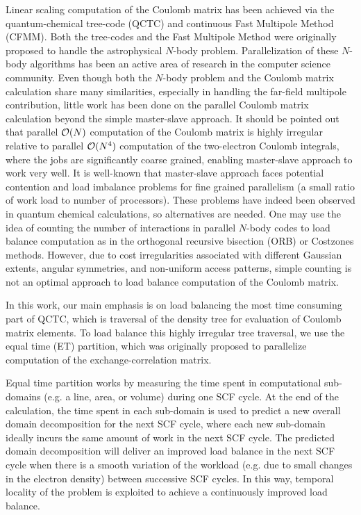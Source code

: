 \commentoutA{\documentclass[prl,aps,twocolumn,twocolumngrid,superbib]{revtex4}}
\begin{document}
Linear scaling computation of the Coulomb matrix has been achieved via
the quantum-chemical tree-code
(QCTC)\cite{MChallacombe96,MChallacombe96B,MChallacombe97} and
continuous Fast Multipole Method
(CFMM)\cite{CWhite94B,CWhite96A,MStrain96}.  Both the
tree-codes\cite{JBarnes86} and the Fast Multipole
Method\cite{LGreengard87,CRAnderson92} were originally proposed to
handle the astrophysical $N$-body problem.  Parallelization of these
$N$-body algorithms has been an active area of research in the
computer science
community\cite{MWarren92,AGrama94,MWarren95b,Singh93,Singh_95v27,YHu96,Grama_98v24,PGibbon02,Antonuccio-Delogu03}.
Even though both the $N$-body problem and the Coulomb matrix
calculation share many similarities, especially in handling the
far-field multipole contribution, little work has been done on the
parallel Coulomb matrix calculation beyond the simple master-slave
approach\cite{Sosa_98v19,Furlani_00v128,Sosa_00v26}.  It should be
pointed out that parallel ${\cal O}(N)$ computation of the Coulomb
matrix is highly irregular relative to parallel ${\cal O}(N^4)$
computation of the two-electron Coulomb integrals, where the jobs are
significantly coarse grained, enabling master-slave approach to work
very well.  It is well-known that master-slave approach faces
potential contention and load imbalance problems for fine grained
parallelism\cite{BWilkinson99,GWilson95} (a small ratio of work load
to number of processors).  These problems have indeed been observed in
quantum chemical calculations\cite{Guerra_95,CGan03}, so alternatives
are needed.  One may use the idea of counting the number of
interactions in parallel $N$-body codes to load balance computation as
in the orthogonal recursive bisection
(ORB)\cite{MWarren92,MWarren95b,MWarren93} or Costzones
methods\cite{Singh93,Singh_95v27}.  However, due to cost
irregularities associated with different Gaussian extents, angular
symmetries, and non-uniform access patterns, simple counting is not an
optimal approach to load balance computation of the Coulomb matrix.

In this work, our main emphasis is on load balancing the most time
consuming part of QCTC, which is traversal of the density tree for
evaluation of Coulomb matrix elements. To load balance this highly
irregular tree traversal, we use the equal time (ET)
partition\cite{CGan03}, which was originally proposed to parallelize
computation of the exchange-correlation matrix.

Equal time partition works by measuring the time spent in
computational sub-domains (e.g. a line, area, or volume) during one
SCF cycle. At the end of the calculation, the time spent in each
sub-domain is used to predict a new overall domain decomposition for
the next SCF cycle, where each new sub-domain ideally incurs the same
amount of work in the next SCF cycle. The predicted domain
decomposition will deliver an improved load balance in the next SCF
cycle when there is a smooth variation of the workload (e.g. due to
small changes in the electron density) between successive SCF cycles.
In this way, temporal locality\cite{JPilkington96} of the problem is
exploited to achieve a continuously improved load balance.
\end{document}

